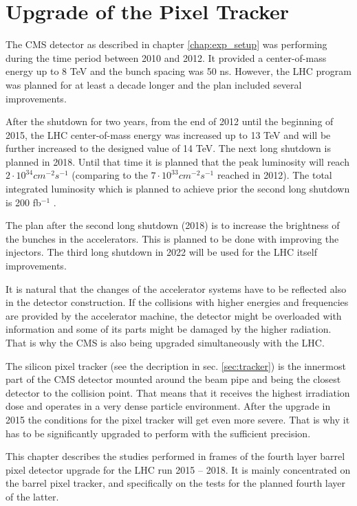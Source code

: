 \chapter{Upgrade of the Pixel Tracker}\label{chapt:pixel}

The CMS detector as described in chapter \ref{chap:exp_setup} was performing during the time period 
between 2010 and 2012. It provided a center-of-mass energy up to 8 TeV and the bunch spacing was 50 ns. 
However, the LHC program was planned for at least a decade longer and the plan included several improvements.

After the shutdown for two years, from the end of 2012 until the beginning of 2015, the LHC 
center-of-mass energy was increased up to 13 TeV and will be further increased to the designed value
of 14 TeV. The next long shutdown is planned in 2018. Until that time it is planned that the peak
luminosity will reach $2 \cdot 10^{34} cm^{-2} s^{-1}$ (comparing to the $7 \cdot 10^{33} cm^{-2}s^{-1}$
reached in 2012). The total integrated luminosity which is planned to achieve prior the second long shutdown
is 200 fb$^{-1}$ \cite{CMS:2012sda}.

The plan after the second long shutdown (2018) is to increase the brightness of the bunches
in the accelerators. This is planned to be done with improving the injectors. The third long shutdown in 2022
will be used for the LHC itself improvements.

It is natural that the changes of the accelerator systems have to be reflected also in the detector construction.
If the collisions with higher energies and frequencies are provided by the accelerator machine, the detector might
be overloaded with information and some of its parts might be damaged by the higher radiation. That is why 
the CMS is also being upgraded simultaneously with the LHC.

The silicon pixel tracker (see the decription in sec. \ref{sec:tracker}) is the innermost part of the CMS 
detector mounted around the beam pipe and being the closest detector to the collision point. That means that
it receives the highest irradiation dose and operates in a very dense particle environment. After the upgrade 
in 2015 the conditions for the pixel tracker will get even more severe. That is why it has to be significantly 
upgraded to perform with the sufficient precision. 

This chapter describes the studies performed in frames of the fourth layer barrel pixel detector upgrade for the
LHC run 2015 -- 2018. It is mainly concentrated on the barrel pixel tracker, and specifically on the tests for the
planned fourth layer of the latter.

